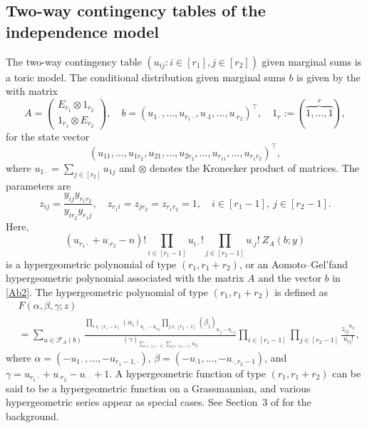 \documentclass[a4paper,12pt]{article}
\theoremstyle{plain}
\theoremstyle{remark}
\begin{document}
\subsection{Two-way contingency tables of the independence model}
\label{subs:2}

The two-way contingency table $(u_{ij}:i\in[r_1],j\in[r_2])$
given marginal sums is a toric model.
The conditional distribution given marginal sums $b$ is
given by the with matrix
\begin{equation}
  A=\left(\begin{array}{c}
  E_{r_1} \otimes 1_{r_2}\\
  1_{r_1} \otimes E_{r_2}
  \end{array}\right), \quad
  b=(u_{1\cdot},\ldots,u_{r_1\cdot},u_{\cdot1},\ldots,u_{\cdot r_2})^\top,
  \quad
  1_r:=(\overbrace{1,\ldots,1}^r),
  \label{Ab2}
\end{equation}
for the state vector
\[
  (u_{11},\ldots,u_{1r_2},u_{21},\ldots,u_{2r_2},\ldots,
   u_{r_11},\ldots,u_{r_1r_2})^\top,
\]
where $u_{1\cdot}=\sum_{j\in[r_2]}u_{1j}$ and $\otimes$
denotes the Kronecker product of matrices. 
The parameters are
\[
  z_{ij}=\frac{y_{ij}y_{r_1r_2}}{y_{ir_2}y_{r_1j}}, \quad
  z_{r_1i}=z_{jr_2}=z_{r_1r_2}=1, \quad i\in[r_1-1],~j\in[r_2-1].
\]
Here,
\[
  (u_{r_1\cdot}+u_{\cdot r_2}-n)!\prod_{i\in[r_1-1]}
  u_{i\cdot}!\prod_{j\in[r_2-1]}u_{\cdot j}!~Z_A(b;y)
\]
is a hypergeometric polynomial of type $(r_1,r_1+r_2)$,
or an Aomoto--Gel'fand hypergeometric polynomial associated with
the matrix $A$ and the vector $b$ in \eqref{Ab2}.
The hypergeometric polynomial of type $(r_1,r_1+r_2)$ is defined
as
\begin{align}
  &F(\alpha,\beta,\gamma;z)\nonumber\\
  &=\sum_{u\in\mathcal{F}_A(b)}
  \frac{
  \prod_{i\in[r_1-1]}(\alpha_i)_{u_{i\cdot}-u_{ir_2}}
  \prod_{j\in[r_2-1]}(\beta_j)_{u_{\cdot j}-u_{r_1j}}}
       {(\gamma)_{\sum_{i\in[r_1-1]}\sum_{j\in[r_2-1]}u_{ij}}}
  \prod_{i\in[r_1-1]}\prod_{j\in[r_2-1]}\frac{{z_{ij}}^{u_{ij}}}
  {u_{ij}!},
  \label{thyp}
\end{align}
where $\alpha=(-u_{1\cdot},\ldots,-u_{r_1-1,\cdot})$,
$\beta=(-u_{\cdot 1},\ldots,-u_{\cdot,r_2-1})$, and
$\gamma=u_{r_1\cdot}+u_{\cdot r_2}-u_{\cdot\cdot}+1$.
A hypergeometric function of type $(r_1,r_1+r_2)$ can be said
to be a hypergeometric function on a Grassmannian, and
various hypergeometric series appear as special cases. See
Section~3 of \cite{AK11} for the background.
\end{document}
